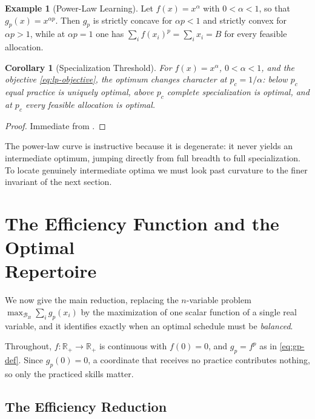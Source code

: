 \documentclass[11pt]{article}
\newtheorem{corollary}[theorem]{Corollary}
\theoremstyle{definition}
\newtheorem{example}[theorem]{Example}
\theoremstyle{remark}
\newcommand{\Rplus}{\mathbb{R}_{+}}
\newcommand{\simplex}{\mathcal{B}}
\begin{document}
\begin{example}[Power-Law Learning]
\label{ex:power-law}
Let \(f(x)=x^\alpha\) with \(0<\alpha<1\), so that \(g_p(x)=x^{\alpha p}\).
Then \(g_p\) is strictly concave for \(\alpha p<1\) and strictly convex for
\(\alpha p>1\), while at \(\alpha p=1\) one has
\(\sum_i f(x_i)^{p}=\sum_i x_i=B\) for every feasible allocation.
\end{example}

\begin{corollary}[Specialization Threshold]
\label{cor:threshold}
For \(f(x)=x^\alpha\), \(0<\alpha<1\), and the objective
\eqref{eq:lp-objective}, the optimum changes character at
\(p_c=1/\alpha\): below \(p_c\) equal practice is uniquely optimal, above
\(p_c\) complete specialization is optimal, and at \(p_c\) every feasible
allocation is optimal.
\end{corollary}

\begin{proof}
Immediate from .
\end{proof}

The power-law curve is instructive because it is degenerate: it never
yields an intermediate optimum, jumping directly from full breadth to
full specialization. To locate genuinely intermediate optima we must
look past curvature to the finer invariant of the next section.

\section[The Efficiency Function and the Optimal Repertoire]
{The Efficiency Function and the Optimal\\ Repertoire}
\label{sec:efficiency}

We now give the main reduction, replacing the \(n\)-variable problem
\(\max_{\simplex_B}\sum_i g_p(x_i)\) by the maximization of one scalar
function of a single real variable, and it identifies exactly when an
optimal schedule must be \emph{balanced}.

Throughout, \(f:\Rplus\to\Rplus\) is continuous with \(f(0)=0\), and
\(g_p=f^p\) as in \eqref{eq:gp-def}. Since \(g_p(0)=0\), a coordinate
that receives no practice contributes nothing, so only the practiced
skills matter.

\subsection{The Efficiency Reduction}
\label{subsec:efficiency}
\end{document}
